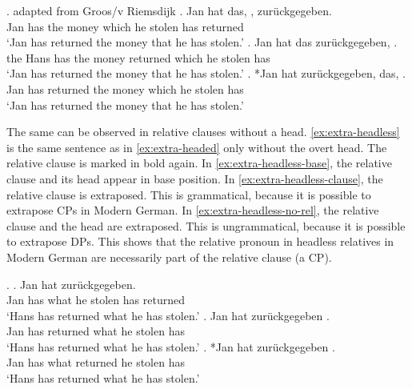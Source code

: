 \ex. \label{ex:extra-headed} adapted from Groos/v Riemsdijk
\ag. Jan hat das,    , zurückgegeben.\\
Jan has the money which he stolen has returned\\
\glt `Jan has returned the money that he has stolen.'\label{ex:extra-headed-base}
\bg. Jan hat das zurückgegeben,    .\\
the Hans has the money returned which he stolen has\\
\glt `Jan has returned the money that he has stolen.'\label{ex:extra-headed-only-clause}
\cg. *Jan hat zurückgegeben, das,    .\\
Jan has returned the money which he stolen has\\
\glt `Jan has returned the money that he has stolen.'\label{ex:extra-headed-head-clause}

The same can be observed in relative clauses without a head. \ref{ex:extra-headless} is the same sentence as in \ref{ex:extra-headed} only without the overt head. The relative clause is marked in bold again.
In \ref{ex:extra-headless-base}, the relative clause and its head appear in base position. In \ref{ex:extra-headless-clause}, the relative clause is extraposed. This is grammatical, because it is possible to extrapose CPs in Modern German. In \ref{ex:extra-headless-no-rel}, the relative clause and the head are extraposed. This is ungrammatical, because it is possible to extrapose DPs.
This shows that the relative pronoun in headless relatives in Modern German are necessarily part of the relative clause (a CP).

\ex.\label{ex:extra-headless}
\ag. Jan hat     zurückgegeben.\\
Jan has what he stolen has returned\\
`Hans has returned what he has stolen.' \citet[185]{groos1981}\label{ex:extra-headless-base}
\bg. Jan hat zurückgegeben    .\\
Jan has returned what he stolen has\\
`Hans has returned what he has stolen.' \citet[185]{groos1981}\label{ex:extra-headless-clause}
\bg. *Jan hat  zurückgegeben   .\\
Jan has what returned he stolen has\\
`Hans has returned what he has stolen.' \citet[185]{groos1981}\label{ex:extra-headless-no-rel}

